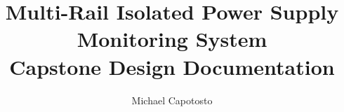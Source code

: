 
\author{Michael Capotosto}

\title{
    Multi-Rail Isolated Power Supply Monitoring System\\[0.5em]
    \large Capstone Design Documentation
}

\date{
    \manualdate\\[1em]
    \small \manualrev
}